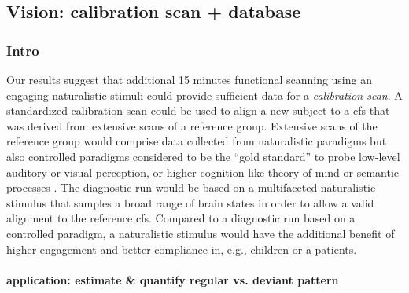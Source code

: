 \subsection{Vision: calibration scan + database}







\subsubsection{Intro}



%
Our results suggest that additional 15 minutes functional scanning using an
engaging naturalistic stimuli could provide sufficient data for a
\textit{calibration scan}.
%
A standardized calibration scan could be used to align a new subject to a
\ac{cfs} that was derived from extensive scans of a reference group.
%
Extensive scans of the reference group would comprise data collected from
naturalistic paradigms but also controlled paradigms considered to be the ``gold
standard'' to probe low-level auditory or visual perception, or higher cognition
like theory of mind \citep{spunt2014validating} or semantic processes
\citep{fedorenko2010new, fernandez2001language}.
%
The diagnostic run would be based on a multifaceted naturalistic stimulus that
samples a broad range of brain states in order to allow a valid alignment to the
reference \ac{cfs}.
%
Compared to a diagnostic run based on a controlled paradigm, a naturalistic
stimulus would have the additional benefit of higher engagement and better
compliance \citep{vanderwal2015inscapes, eickhoff2020towards} in, e.g., children
or a patients.


\paragraph{application: estimate \& quantify regular vs. deviant pattern}

